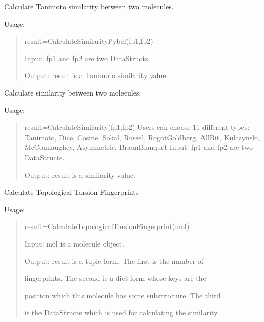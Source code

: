 \documentclass[letterpaper,10pt,english]{sphinxmanual}
\begin{document}
\begin{fulllineitems}
\label{reference/fingerprint:fingerprint.CalculateSimilarityPybel}
Calculate Tanimoto similarity between two molecules.

Usage:
\begin{quote}

result=CalculateSimilarityPybel(fp1,fp2)

Input: fp1 and fp2 are two DataStructs.

Output: result is a Tanimoto similarity value.
\end{quote}

\end{fulllineitems}


\begin{fulllineitems}
\label{reference/fingerprint:fingerprint.CalculateSimilarityRdkit}
Calculate similarity between two molecules.

Usage:
\begin{quote}

result=CalculateSimilarity(fp1,fp2)
Users can choose 11 different types:
Tanimoto, Dice, Cosine, Sokal, Russel,
RogotGoldberg, AllBit, Kulczynski, 
McConnaughey, Asymmetric, BraunBlanquet       
Input: fp1 and fp2 are two DataStructs.

Output: result is a similarity value.
\end{quote}

\end{fulllineitems}


\begin{fulllineitems}
\label{reference/fingerprint:fingerprint.CalculateTopologicalTorsionFingerprint}
Calculate Topological Torsion Fingerprints

Usage:
\begin{quote}

result=CalculateTopologicalTorsionFingerprint(mol)

Input: mol is a molecule object.

Output: result is a tuple form. The first is the number of

fingerprints. The second is a dict form whose keys are the

position which this molecule has some substructure. The third

is the DataStructs which is used for calculating the similarity.
\end{quote}

\end{fulllineitems}
\end{document}
